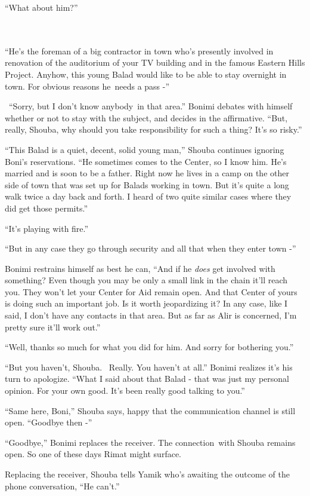 \documentclass[twoside,11pt]{book}
\begin{document}
``What about him?''
~~~~~~~~~~~~~~~~~~~~~~~~~~~~~~~~~~~~~~~~~~~~~~~~~~~~~~~~~~~~~~~~~~~~~~~~~~~~~~

``He's the foreman of a big contractor in town who's presently involved in renovation of the auditorium of
your TV building and in the famous Eastern Hills Project. Anyhow, this young Balad would like to be able to stay
overnight in town. For obvious reasons he~needs a pass -''

~``Sorry, but I don't know anybody~in that area.'' Bonimi debates with himself whether or not
to stay with the subject, and decides in the affirmative. ``But, really, Shouba, why should you take
responsibility for such a thing? It's so risky.''

``This Balad is a quiet, decent, solid young man,'' Shouba continues ignoring Boni's
reservations. ``He sometimes comes to the Center, so I know him. He's married and is soon to be a father.
Right now he lives in a camp on the other side of town that was set up for Balads working in town. But it's quite a
long walk twice a day back and forth. I heard of two quite similar cases where they did get those
permits.''

``It's playing with fire.''

``But in any case they go through security and all that when they enter town -''

Bonimi restrains himself as best he can, ``And if he \textit{does} get involved with something? Even though
you may be only a small link in the chain it'll reach you. They won't let your Center for Aid remain open. And that
Center of yours is doing such an important job. Is it worth jeopardizing it? In any case, like I said, I don't have any
contacts in that area. But as far as Alir is concerned, I'm pretty sure it'll work out.''

``Well, thanks so much for what you did for him. And sorry for bothering you.''

``But you haven't, Shouba. \ Really. You haven't at all.'' Bonimi realizes it's his turn to
apologize. ``What I said about that Balad - that was just my personal opinion. For your own good. It's
been really good{ }talking to you.''

``Same here, Boni,'' Shouba says, happy that the communication channel is still open.
``Goodbye then -''

``Goodbye,'' Bonimi replaces the receiver. The connection~with Shouba remains open. So one of
these days Rimat might surface.

Replacing the receiver, Shouba tells Yamik who's awaiting the outcome of the phone conversation, ``He
can't.''
\end{document}
